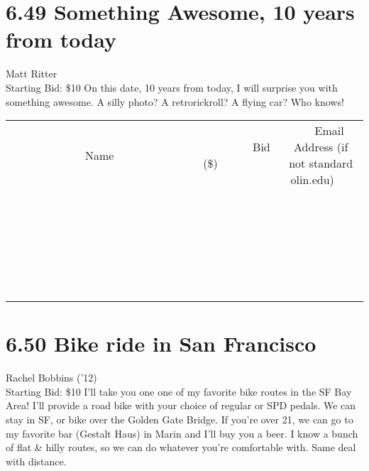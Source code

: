 \documentclass[11pt]{article}
\begin{document}
\section*{6.49 Something Awesome, 10 years from today}
Matt Ritter
\\
Starting Bid: \$10
\newline
On this date, 10 years from today, I will surprise you with something awesome. A silly photo? A retrorickroll? A flying car? Who knows!
\\[6ex]
\begin{tabular}{c c c}
~~~~~~~~~~~~~Name~~~~~~~~~~~~~ & ~~~~~~~~~Bid (\$)~~~~~~~~~  & ~~~Email Address (if not standard olin.edu)~~~\\
 & & \\
\hline
 & & \\
\hline
 & & \\
\hline
 & & \\
\hline
 & & \\
\hline
 & & \\
\hline
 & & \\
\hline
 & & \\
\hline
 & & \\
\hline
 & & \\
\hline
 & & \\
\hline
 & & \\
\hline
 & & \\
\hline
 & & \\
\hline
 & & \\
\hline
 & & \\
\hline
 & & \\
\hline
 & & \\
\hline
 & & \\
\hline
 & & \\
\hline
 & & \\
\hline
 & & \\
\hline
 & & \\
\hline
 & & \\
\hline
 & & \\
\hline
 & & \\
\hline
\end{tabular}
\newpage
\section*{6.50 Bike ride in San Francisco}
Rachel Bobbins ('12)
\\
Starting Bid: \$10
\newline
I'll take you one one of my favorite bike routes in the SF Bay Area! I'll provide a road bike with your choice of regular or SPD pedals. We can stay in SF, or bike over the Golden Gate Bridge. If you're over 21, we can go to my favorite bar (Gestalt Haus) in Marin and I'll buy you a beer. I know a bunch of flat \& hilly routes, so we can do whatever you're comfortable with. Same deal with distance.
\end{document}
